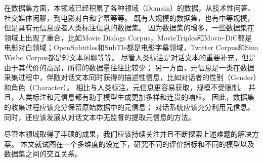 在数据集方面，本领域已经积累了各种领域（Domain）的数据，从技术性问答、社交媒体闲聊，到电影对白和字幕等等。
既有大规模的数据集，也有中等规模，但是具有元信息或者人类标注信息的数据集。
因为数据集的增多，一些数据集在领域上出现了重合，比如Movie Dialogs Corpus，MovieTriples和Movie-DiC都是
电影对白领域；OpenSubtitles和SubTle都是电影字幕领域，Twitter Corpus和Sina Weibo Corpus都是短文本闲聊等等。
尽管人类标注是对话文本的重要补充，但是由于其代价的高昂，所得的数据量往往比较少；
另一方面，元信息是一类在数据采集过程中，伴随对话文本同时获得的描述性信息，比如对话者的性别（Gender）和角色（Character）。
相比与人类标注，元信息更容易获取，规模不受限制。
并且，人类标注和元信息都有助于模型生成更加多样和连贯的响应。
因此，数据集的收集过程应该充分保留原始数据中的元信息； 对话系统应该充分利用元信息。
同时，还应该发展从对话文本中无监督的提取元信息的方法。

尽管本领域取得了丰硕的成果，我们应该持续关注并且不断探索上述难题的解决方案。
本文就试图在一个多维度的设定下，研究不同的评价指标和不同的模型以及数据集之间的交互关系。
